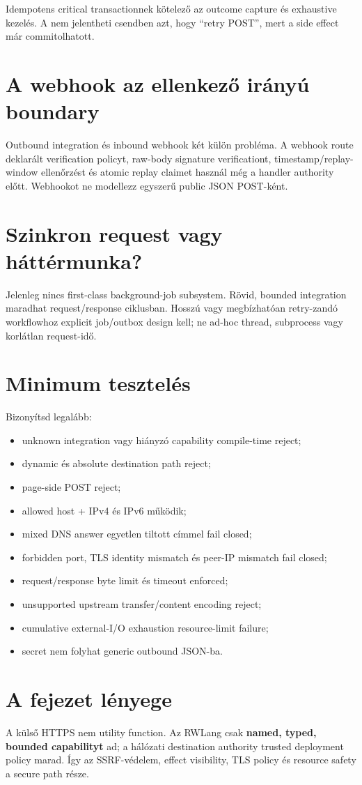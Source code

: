 Idempotens critical transactionnek kötelező az outcome capture és exhaustive kezelés. A  nem jelentheti csendben azt, hogy ``retry POST'', mert a side effect már commitolhatott.

\section{A webhook az ellenkező irányú boundary}

Outbound integration és inbound webhook két külön probléma. A webhook route deklarált verification policyt, raw-body signature verificationt, timestamp/replay-window ellenőrzést és atomic replay claimet használ még a handler authority előtt. Webhookot ne modellezz egyszerű public JSON POST-ként.

\section{Szinkron request vagy háttérmunka?}

Jelenleg nincs first-class background-job subsystem. Rövid, bounded integration maradhat request/response ciklusban. Hosszú vagy megbízhatóan retry-zandó workflowhoz explicit job/outbox design kell; ne ad-hoc thread, subprocess vagy korlátlan request-idő.

\section{Minimum tesztelés}

Bizonyítsd legalább:

\begin{itemize}
  \item unknown integration vagy hiányzó  capability compile-time reject;
  \item dynamic és absolute destination path reject;
  \item page-side POST reject;
  \item allowed host + IPv4 és IPv6 működik;
  \item mixed DNS answer egyetlen tiltott címmel fail closed;
  \item forbidden port, TLS identity mismatch és peer-IP mismatch fail closed;
  \item request/response byte limit és timeout enforced;
  \item unsupported upstream transfer/content encoding reject;
  \item cumulative external-I/O exhaustion resource-limit failure;
  \item secret nem folyhat generic outbound JSON-ba.
\end{itemize}

\section{A fejezet lényege}

A külső HTTPS nem utility function. Az RWLang csak \textbf{named, typed, bounded capabilityt} ad; a hálózati destination authority trusted deployment policy marad. Így az SSRF-védelem, effect visibility, TLS policy és resource safety a secure path része.
